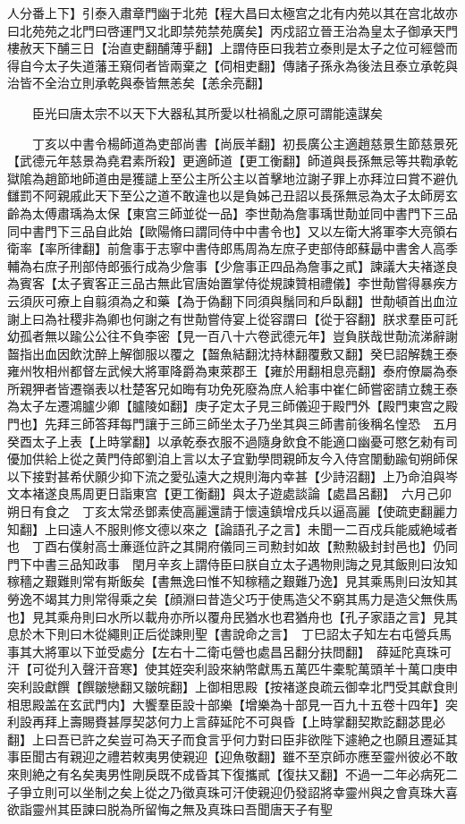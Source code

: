 人分番上下】引泰入肅章門幽于北苑【程大昌曰太極宫之北有内苑以其在宫北故亦曰北苑苑之北門曰啓運門又北即禁苑禁苑廣矣】丙戍詔立晉王治為皇太子御承天門樓赦天下酺三日【治直吏翻酺薄乎翻】上謂侍臣曰我若立泰則是太子之位可經營而得自今太子失道藩王窺伺者皆兩棄之【伺相吏翻】傳諸子孫永為後法且泰立承乾與治皆不全治立則承乾與泰皆無恙矣【恙余亮翻】

　　臣光曰唐太宗不以天下大器私其所愛以杜禍亂之原可謂能遠謀矣

　　丁亥以中書令楊師道為吏部尚書【尚辰羊翻】初長廣公主適趙慈景生節慈景死【武德元年慈景為堯君素所殺】更適師道【更工衡翻】師道與長孫無忌等共鞫承乾獄隂為趙節地師道由是獲譴上至公主所公主以首擊地泣謝子罪上亦拜泣曰賞不避仇讎罰不阿親戚此天下至公之道不敢違也以是負姊己丑詔以長孫無忌為太子太師房玄齡為太傅肅瑀為太保【東宫三師並從一品】李世勣為詹事瑀世勣並同中書門下三品同中書門下三品自此始【歐陽脩曰謂同侍中中書令也】又以左衛大將軍李大亮領右衛率【率所律翻】前詹事于志寧中書侍郎馬周為左庶子吏部侍郎蘇朂中書舍人高季輔為右庶子刑部侍郎張行成為少詹事【少詹事正四品為詹事之貳】諫議大夫褚遂良為賓客【太子賓客正三品古無此官唐始置掌侍從規諫贊相禮儀】李世勣嘗得暴疾方云須灰可療上自翦須為之和藥【為于偽翻下同須與鬚同和戶臥翻】世勣頓首出血泣謝上曰為社稷非為卿也何謝之有世勣嘗侍宴上從容謂曰【從于容翻】朕求羣臣可託幼孤者無以踰公公往不負李密【見一百八十六卷武德元年】豈負朕哉世勣流涕辭謝齧指出血因飲沈醉上解御服以覆之【齧魚結翻沈持林翻覆敷又翻】癸巳詔解魏王泰雍州牧相州都督左武候大將軍降爵為東萊郡王【雍於用翻相息亮翻】泰府僚屬為泰所親狎者皆遷嶺表以杜楚客兄如晦有功免死廢為庶人給事中崔仁師嘗密請立魏王泰為太子左遷鴻臚少卿【臚陵如翻】庚子定太子見三師儀迎于殿門外【殿門東宫之殿門也】先拜三師答拜每門讓于三師三師坐太子乃坐其與三師書前後稱名惶恐　五月癸酉太子上表【上時掌翻】以承乾泰衣服不過隨身飲食不能適口幽憂可愍乞勑有司優加供給上從之黄門侍郎劉洎上言以太子宜勤學問親師友今入侍宫闈動踰旬朔師保以下接對甚希伏願少抑下流之愛弘遠大之規則海内幸甚【少詩沼翻】上乃命洎與岑文本褚遂良馬周更日詣東宫【更工衡翻】與太子遊處談論【處昌呂翻】　六月己卯朔日有食之　丁亥太常丞鄧素使高麗還請于懷遠鎮增戍兵以逼高麗【使疏吏翻麗力知翻】上曰遠人不服則修文德以來之【論語孔子之言】未聞一二百戍兵能威絶域者也　丁酉右僕射高士亷遜位許之其開府儀同三司勲封如故【勲勲級封封邑也】仍同門下中書三品知政事　閏月辛亥上謂侍臣曰朕自立太子遇物則誨之見其飯則曰汝知稼穡之艱難則常有斯飯矣【書無逸曰惟不知稼穡之艱難乃逸】見其乘馬則曰汝知其勞逸不竭其力則常得乘之矣【顔淵曰昔造父巧于使馬造父不窮其馬力是造父無佚馬也】見其乘舟則曰水所以載舟亦所以覆舟民猶水也君猶舟也【孔子家語之言】見其息於木下則曰木從繩則正后從諫則聖【書說命之言】　丁巳詔太子知左右屯營兵馬事其大將軍以下並受處分【左右十二衛屯營也處昌呂翻分扶問翻】　薛延陀真珠可汗【可從刋入聲汗音寒】使其姪突利設來納幣獻馬五萬匹牛橐駝萬頭羊十萬口庚申突利設獻饌【饌皺戀翻又皺皖翻】上御相思殿【按褚遂良疏云御幸北門受其獻食則相思殿盖在玄武門内】大饗羣臣設十部樂【增樂為十部見一百九十五卷十四年】突利設再拜上壽賜賚甚厚契苾何力上言薛延陀不可與昏【上時掌翻契欺訖翻苾毘必翻】上曰吾已許之矣豈可為天子而食言乎何力對曰臣非欲陛下遽絶之也願且遷延其事臣聞古有親迎之禮若敕夷男使親迎【迎魚敬翻】雖不至京師亦應至靈州彼必不敢來則絶之有名矣夷男性剛戾既不成昏其下復攜貳【復扶又翻】不過一二年必病死二子爭立則可以坐制之矣上從之乃徵真珠可汗使親迎仍發詔將幸靈州與之會真珠大喜欲詣靈州其臣諫曰脱為所留悔之無及真珠曰吾聞唐天子有聖